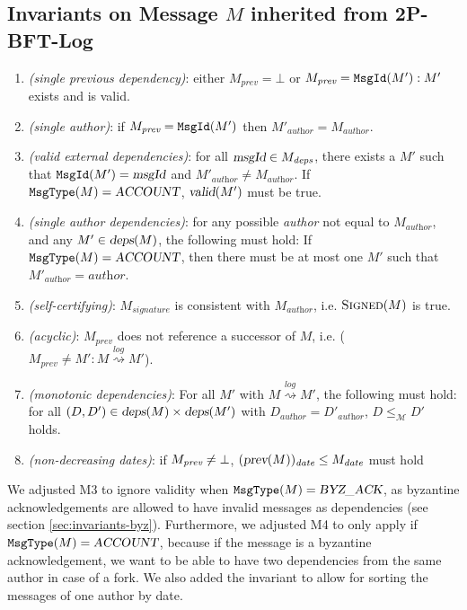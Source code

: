 \subsection{Invariants on Message \(M\) inherited from 2P-BFT-Log}
\label{sec:invariants-2p-bft-log}
\begin{enumerate}
    \item [\var{M1}] \emph{(single previous dependency)}: either $M_\textit{prev} = \bot$ or $M_\textit{prev} = \texttt{MsgId}(M'): M'$ exists and is valid.
    \item [\var{M2}] \emph{(single author)}: if $M_\textit{prev} = \texttt{MsgId}(M')$ then $M'_\textit{author} = M_\textit{author}$.
    \item [\var{M3}] \emph{(valid external dependencies)}: for all $\textit{\textsl{\textsl{msgId}}} \in M_\textit{deps}$, there exists a $M'$ such that $\texttt{MsgId}(M') = \textsl{msgId}$ and $M'_\textit{author} \neq M_\textit{author}$. If $\texttt{MsgType}(M) = \textsl{ACCOUNT}$, $\textsl{valid}(M')$ must be true.
    \item [\var{M4}] \emph{(single author dependencies)}: for any possible \textit{author} not equal to $M_\textit{author}$, and any $M' \in \textsl{deps}(M)$, the following must hold: If $\texttt{MsgType}(M) = \textsl{ACCOUNT}$, then there must be at most one $M'$ such that $M'_\textit{author} = \textit{author}$.
    \item [\var{M5}] \emph{(self-certifying)}: $M_\textit{signature}$ is consistent with $M_\textit{author}$, i.e. $\textsc{Signed}(M)$ is true.
    \item [\var{M6}] \emph{(acyclic)}: $M_\textit{prev}$ does not reference a successor of $M$, i.e. ($M_\textit{prev} \neq M' : M \stackrel{\textit{log}}{\rightsquigarrow} M'$).
    \item [\var{M7}] \emph{(monotonic dependencies)}: For all $M'$ with $M \stackrel{log}{\rightsquigarrow} M'$, the following must hold: for all $(D, D') \in \textsl{deps}(M) \times \textsl{deps}(M')$ with $D_\textit{author} = D'_\textit{author}$, $D \le_\mathcal M D'$ holds.
    \item [\var{M8}] \emph{(non-decreasing dates)}: if $M_\emph{prev} \ne \bot$, $(\textsl{prev}(M))_\textit{date} \leq M_\textit{date}$ must hold
\end{enumerate}
We adjusted M3 to ignore validity when $\texttt{MsgType}(M) = \textsl{BYZ\_ACK}$, as byzantine acknowledgements are allowed to have invalid messages as dependencies (see section \ref{sec:invariants-byz}). Furthermore, we adjusted M4 to only apply if $\texttt{MsgType}(M) = \textsl{ACCOUNT}$, because if the message is a byzantine acknowledgement, we want to be able to have two dependencies from the same author in case of a fork. We also added the invariant  to allow for sorting the messages of one author by date.
